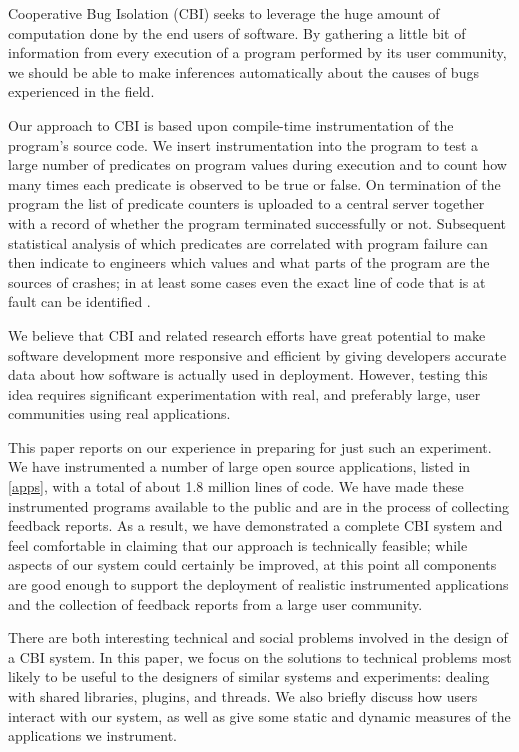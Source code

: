 \documentclass[10pt,twocolumn]{article}
\begin{document}
Cooperative Bug Isolation (CBI) seeks to leverage the
huge amount of computation done by the end users of software.  By
gathering a little bit of information from every execution of a
program performed by its user community, we should be able to make
inferences automatically about the causes of bugs experienced in the field.

Our approach to CBI is based upon compile-time instrumentation of the
program's source code.  We insert instrumentation into the program to
test a large number of predicates on program values during
execution and to count how many times each predicate is observed to be
true or false.  On termination of the program the list of predicate
counters is uploaded to a central server together with a record of
whether the program terminated successfully or not.  Subsequent
statistical analysis of which predicates are correlated with program
failure can then indicate to engineers which values and what parts of
the program are the sources of crashes; in at least some cases even
the exact line of code that is at fault can be identified \cite{PLDI`03*141,Liblit:2003:SUEBI,Zheng:2003:SDSP}.

We believe that CBI and related research efforts have great potential
to make software development more responsive and efficient by giving
developers accurate data about how software is actually used in
deployment.  However, testing this idea requires significant
experimentation with real, and preferably large, user communities
using real applications.

This paper reports on our experience in preparing for just such an
experiment.  We have instrumented a number of large open source
applications, listed in \autoref{apps}, with a total of about 1.8
million lines of code. We have made these instrumented programs
available to the public and are in the process of collecting feedback
reports.  As a result, we have demonstrated a complete CBI system and
feel comfortable in claiming that our approach is technically
feasible; while aspects of our system could certainly be improved, at
this point all components are good enough to support the deployment of
realistic instrumented applications and the collection of feedback
reports from a large user community.

There are both interesting technical and social problems involved in
the design of a CBI system.  In this paper, we focus on the solutions
to technical problems most likely to be useful to the designers of
similar systems and experiments: dealing with shared libraries,
plugins, and threads.  We also briefly discuss how users interact with
our system, as well as give some static and dynamic measures of the
applications we instrument.
\end{document}
